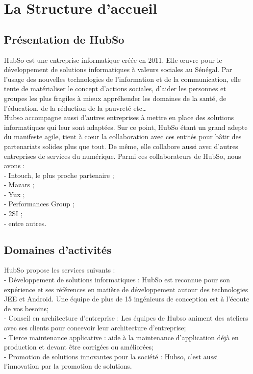 \chapter{La Structure d'accueil}

\section{Présentation de HubSo}

HubSo est une entreprise informatique créée en 2011. Elle œuvre pour le développement de solutions informatiques à valeurs sociales au Sénégal. Par l’usage des nouvelles technologies de l'information et de la communication, elle tente de matérialiser le concept d’actions sociales, d’aider les personnes et groupes les plus fragiles à mieux appréhender les domaines de la santé, de l’éducation, de la réduction de la pauvreté etc… \\
Hubso accompagne aussi d'autres entreprises à mettre en place des solutions informatiques qui leur sont adaptées. Sur ce point, HubSo étant un grand adepte du manifeste agile, tient à cœur la collaboration avec ces entités pour bâtir des partenariats solides plus que tout. De même, elle collabore aussi avec d'autres entreprises de services du numérique. Parmi ces collaborateurs de HubSo, nous avons : \\
- Intouch, le plus proche partenaire ;\\
- Mazars ;\\ 
- Yux ;\\
- Performances Group ;\\
- 2SI ;\\
- entre autres.

\section{Domaines d'activités}

HubSo propose les services suivants : \\
- Développement de solutions informatiques : HubSo est reconnue pour son expérience et ses références en matière de développement autour des technologies JEE et Android. Une équipe de plus de 15 ingénieurs de conception est à l'écoute de vos besoins; \\
- Conseil en architecture d'entreprise : Les équipes de Hubso animent des ateliers avec ses clients  pour concevoir leur architecture d'entreprise; \\
- Tierce maintenance applicative : aide à la maintenance d'application déjà en production et devant être corrigées ou améliorées; \\
- Promotion de solutions innovantes pour la société : Hubso, c'est aussi l'innovation par la promotion de solutions.\\

